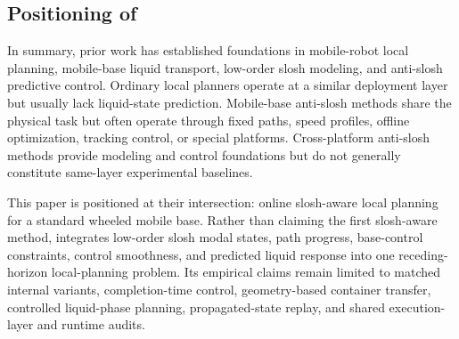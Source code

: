 \subsection{Positioning of \SMPCC{}}

In summary, prior work has established foundations in mobile-robot local planning, mobile-base liquid transport, low-order slosh modeling, and anti-slosh predictive control.
Ordinary local planners operate at a similar deployment layer but usually lack liquid-state prediction.
Mobile-base anti-slosh methods share the physical task but often operate through fixed paths, speed profiles, offline optimization, tracking control, or special platforms.
Cross-platform anti-slosh methods provide modeling and control foundations but do not generally constitute same-layer experimental baselines.

This paper is positioned at their intersection: online slosh-aware \MPCC{} local planning for a standard wheeled mobile base.
Rather than claiming the first slosh-aware \MPC{} method, \SMPCC{} integrates low-order slosh modal states, path progress, base-control constraints, control smoothness, and predicted liquid response into one receding-horizon local-planning problem. Its empirical claims remain limited to matched internal \MPCC{} variants, completion-time control, geometry-based container transfer, controlled liquid-phase planning, propagated-state replay, and shared execution-layer and runtime audits.
